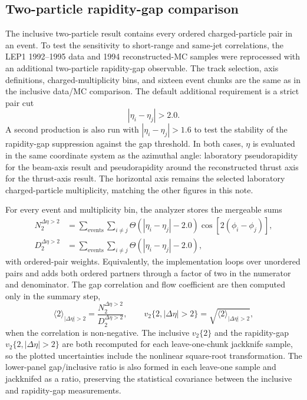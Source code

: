 \documentclass{article}
\newcommand{\vn}[2]{\ensuremath{v_{#1}\{#2\}}}
\begin{document}
\subsection{Two-particle rapidity-gap comparison}
\label{subsec:eta-gap-comparison}

The inclusive two-particle result contains every ordered charged-particle pair
in an event. To test the sensitivity to short-range and same-jet correlations,
the LEP1 1992--1995 data and 1994 reconstructed-MC samples were reprocessed with an
additional two-particle rapidity-gap observable. The track selection,
axis definitions, charged-multiplicity bins, and sixteen event chunks are the
same as in the inclusive data/MC comparison. The default additional requirement is a strict pair cut
\begin{equation}
  |\eta_i-\eta_j| > 2.0.
\end{equation}
A second production is also run with \(|\eta_i-\eta_j|>1.6\) to test the
stability of the rapidity-gap suppression against the gap threshold. In both cases,
\(\eta\) is evaluated in the same coordinate system as the azimuthal angle:
laboratory pseudorapidity for the beam-axis result and pseudorapidity around the
reconstructed thrust axis for the thrust-axis result. The horizontal axis remains
the selected laboratory charged-particle multiplicity, matching the other
figures in this note.

For every event and multiplicity bin, the analyzer stores the mergeable sums
\begin{align}
  N_{2}^{\Delta\eta>2} &=
  \sum_{\mathrm{events}} \sum_{i\ne j}
  \Theta(|\eta_i-\eta_j|-2.0)\cos\left[2(\phi_i-\phi_j)\right], \\
  D_{2}^{\Delta\eta>2} &=
  \sum_{\mathrm{events}} \sum_{i\ne j}
  \Theta(|\eta_i-\eta_j|-2.0),
\end{align}
with ordered-pair weights. Equivalently, the implementation loops over
unordered pairs and adds both ordered partners through a factor of two in the
numerator and denominator. The gap correlation and flow coefficient are then
computed only in the summary step,
\begin{equation}
  \langle 2\rangle_{|\Delta\eta|>2} =
  \frac{N_{2}^{\Delta\eta>2}}{D_{2}^{\Delta\eta>2}},\qquad
  \vn{2}{2,|\Delta\eta|>2} =
  \sqrt{\langle 2\rangle_{|\Delta\eta|>2}},
\end{equation}
when the correlation is non-negative. The inclusive \(\vn{2}{2}\) and the
rapidity-gap \(\vn{2}{2,|\Delta\eta|>2}\) are both recomputed for each
leave-one-chunk jackknife sample, so the plotted uncertainties include the
nonlinear square-root transformation. The lower-panel gap/inclusive ratio is
also formed in each leave-one sample and jackknifed as a ratio, preserving the
statistical covariance between the inclusive and rapidity-gap measurements.
\end{document}
